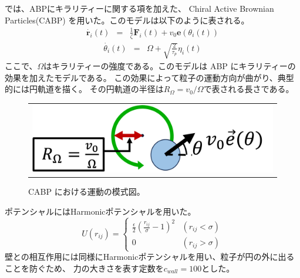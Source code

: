 \documentclass[/Users/ikedahajime/GitHub/reserch/master_report/thesis]{subfiles}
\begin{document}
では、ABPにキラリティーに関する項を加えた、 Chiral Active Brownian Particles(CABP)%
を用いた。このモデルは以下のように表される。
\begin{eqnarray}\label{eq:eom_CABP_1}
    \dot{\bm{r}_i}(t) &=& \frac{1}{\zeta} \bm{F}_i(t)+v_0 \bm{e}(\theta_i (t))
\end{eqnarray}
\begin{eqnarray}\label{eq:eom_CABP_2}
    \dot{\theta_i }(t) &=& \Omega+\sqrt{\frac{2}{\tau_p}}\eta_i(t)
\end{eqnarray}
ここで、$\Omega$はキラリティーの強度である。このモデルは ABP にキラリティーの効果を加えたモデルである。
この効果によって粒子の運動方向が曲がり、典型的には円軌道を描く。
その円軌道の半径は$R_\Omega=v_0/\Omega$で表される長さである。
\begin{figure}
    \centering
    \begin{tabular}{c}
        \begin{minipage}{0.6\hsize}
            \includegraphics[width=\textwidth]{img/method/cabp_motion.png}
        \end{minipage}
    \end{tabular}
    \caption[Four sample images]
    {
        CABP における運動の模式図。
    }
    \label{fig:sample_four_images}
\end{figure}

ポテンシャルにはHarmonicポテンシャルを用いた。
\begin{equation}
    U(r_{ij})=
    \begin{cases}
        \frac{\epsilon}{2}\left(\frac{r_{ij}}{\sigma}-1\right)^2 &(r_{ij}<\sigma)\\
        0 & (r_{ij}>\sigma)

    \end{cases}
\end{equation}
壁との相互作用には同様にHarmonicポテンシャルを用い、粒子が円の外に出ることを防ぐため、
力の大きさを表す定数を$c_{wall}=100$とした。
\end{document}
